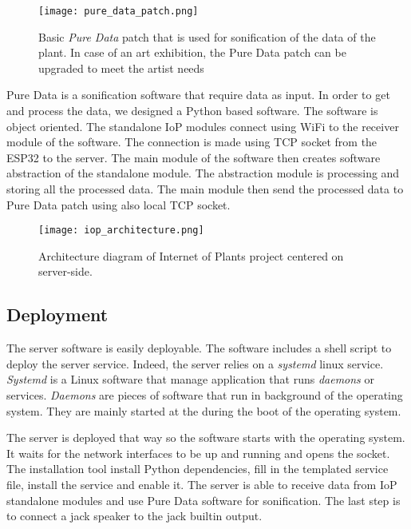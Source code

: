 \begin{figure}[h]
    \centering
    \texttt{[image: pure\_data\_patch.png]}
    \caption{Basic \textit{Pure Data} patch that is used for sonification of the data
    of the plant. In case of an art exhibition, the Pure Data patch can be upgraded to meet the
    artist needs} 
    \vspace{0.1cm}
    \label{fig:pure_data_patch}
\end{figure}


Pure Data is a sonification software that require data as input. In order to get and process the data,
we designed a Python based software.
The software is object oriented. The standalone IoP modules connect using WiFi to the receiver module
of the software. The connection is made using TCP socket from the ESP32 to the server.
The main module of the software then creates software abstraction of the standalone module. 
The abstraction module is processing and storing all the processed data.
The main module then send the processed data to Pure Data patch using also local TCP socket.

\begin{figure}[h]
    \centering
    \texttt{[image: iop\_architecture.png]}
    \caption{Architecture diagram of Internet of Plants project centered on server-side.} 
    \vspace{0.1cm}
    \label{fig:server_architecture}
\end{figure}


\subsection{Deployment} %

The server software is easily deployable. The software includes a shell script to deploy the server service.
Indeed, the server relies on a \textit{systemd} linux service. \textit{Systemd} \cite{Both2020} is a
Linux software that manage application that runs \textit{daemons} or services.
\textit{Daemons} are pieces of software that run in background of the operating
system. They are mainly started at the during the boot of the operating system.

The server is deployed that way so the software starts with the operating system.
It waits for the network interfaces to be up and running and opens the socket.
The installation tool install Python dependencies, fill in the templated service file,
install the service and enable it. The server is able to receive data from IoP standalone
modules and use Pure Data software for sonification. The last step is to connect
a jack speaker to the jack builtin output.

